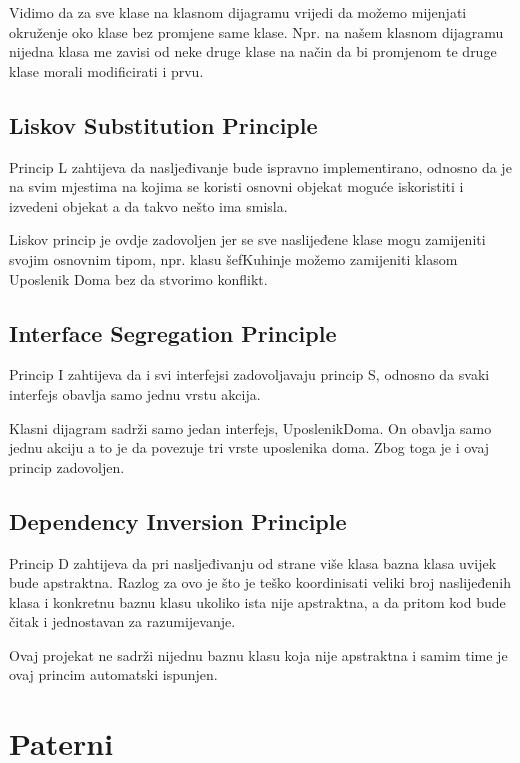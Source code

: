 \documentclass{article}
\begin{document}
Vidimo da za sve klase na klasnom dijagramu vrijedi da možemo mijenjati okruženje oko klase bez promjene same klase. Npr. na našem klasnom dijagramu nijedna klasa me zavisi od neke druge klase na način da bi promjenom te druge klase morali modificirati i prvu.

\subsection{Liskov Substitution Principle}

\hspace{\indent}Princip L zahtijeva da nasljeđivanje bude ispravno implementirano, odnosno da je na svim mjestima na kojima se koristi osnovni objekat moguće iskoristiti i izvedeni objekat a da takvo nešto ima smisla.

Liskov princip je ovdje zadovoljen jer se sve naslijeđene klase mogu zamijeniti svojim osnovnim tipom, npr. klasu šefKuhinje možemo zamijeniti klasom Uposlenik Doma bez da stvorimo konflikt. 

\subsection{Interface Segregation Principle} 

\hspace{\indent}Princip I zahtijeva da i svi interfejsi zadovoljavaju princip S, odnosno da svaki interfejs obavlja samo jednu vrstu akcija.

Klasni dijagram sadrži samo jedan interfejs, UposlenikDoma. On obavlja samo jednu akciju a to je da povezuje tri vrste uposlenika doma. Zbog toga je i ovaj princip zadovoljen.



\subsection{Dependency Inversion Principle}

Princip D zahtijeva da pri nasljeđivanju od strane više klasa bazna klasa uvijek bude apstraktna. Razlog za ovo je što je teško koordinisati veliki broj naslijeđenih klasa i konkretnu baznu klasu ukoliko ista nije apstraktna, a da pritom kod bude čitak i jednostavan za razumijevanje.

Ovaj projekat ne sadrži nijednu baznu klasu koja nije apstraktna i samim time je ovaj princim automatski ispunjen.

\newpage

\section{Paterni}
\end{document}
